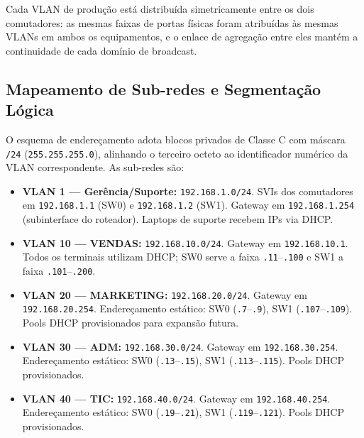 \documentclass[12pt,a4paper]{article}
\begin{document}
Cada VLAN de produção está distribuída simetricamente entre os dois comutadores: as
mesmas faixas de portas físicas foram atribuídas às mesmas VLANs em ambos os
equipamentos, e o enlace de agregação entre eles mantém a continuidade de cada domínio
de broadcast.

\subsection{Mapeamento de Sub-redes e Segmentação Lógica}

\begin{sloppypar}
O esquema de endereçamento adota blocos privados de Classe C com máscara \texttt{/24}
(\texttt{255.255.255.0}), alinhando o terceiro octeto ao identificador numérico da
VLAN correspondente. As sub-redes são:

\begin{itemize}[leftmargin=2em]
  \item \textbf{VLAN 1 --- Gerência/Suporte:} \texttt{192.168.1.0/24}. SVIs dos
        comutadores em \texttt{192.168.1.1} (SW0) e \texttt{192.168.1.2} (SW1).
        Gateway em \texttt{192.168.1.254} (subinterface do roteador). Laptops de
        suporte recebem IPs via DHCP.

  \item \textbf{VLAN 10 --- VENDAS:} \texttt{192.168.10.0/24}. Gateway em
        \texttt{192.168.10.1}. Todos os terminais utilizam DHCP; SW0 serve a
        faixa \texttt{.11}--\texttt{.100} e SW1 a faixa \texttt{.101}--\texttt{.200}.

  \item \textbf{VLAN 20 --- MARKETING:} \texttt{192.168.20.0/24}. Gateway em
        \texttt{192.168.20.254}. Endereçamento estático: SW0 (\texttt{.7}--\texttt{.9}),
        SW1 (\texttt{.107}--\texttt{.109}). Pools DHCP provisionados para
        expansão futura.

  \item \textbf{VLAN 30 --- ADM:} \texttt{192.168.30.0/24}. Gateway em
        \texttt{192.168.30.254}. Endereçamento estático: SW0 (\texttt{.13}--\texttt{.15}),
        SW1 (\texttt{.113}--\texttt{.115}). Pools DHCP provisionados.

  \item \textbf{VLAN 40 --- TIC:} \texttt{192.168.40.0/24}. Gateway em
        \texttt{192.168.40.254}. Endereçamento estático: SW0 (\texttt{.19}--\texttt{.21}),
        SW1 (\texttt{.119}--\texttt{.121}). Pools DHCP provisionados.
\end{itemize}
\end{sloppypar}
\end{document}

